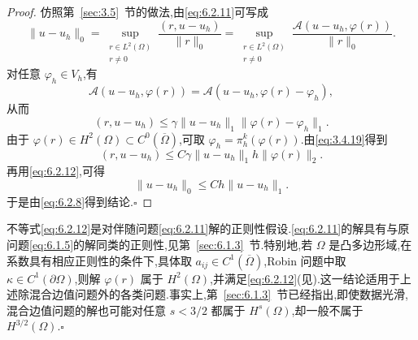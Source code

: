 \begin{proof}
仿照第~\ref{sec:3.5}~节的做法,由\eqref{eq:6.2.11}可写成
\[
  \|u-u_h\|_0
  =\sup_{\substack{r\in L^2(\Omega)\\r\ne0}}\frac{(r,u-u_h)}{\|r\|_0}
  =\sup_{\substack{r\in L^2(\Omega)\\r\ne0}}
       \frac{\mathcal A(u-u_h,\varphi(r))}{\|r\|_0}.
\]
对任意 \(\varphi_h\in V_h\),有
\[
  \mathcal A(u-u_h,\varphi(r))=\mathcal A(u-u_h,\varphi(r)-\varphi_h),
\]
从而
\[
  (r,u-u_h)\le\gamma\|u-u_h\|_1\|\varphi(r)-\varphi_h\|_1.
\]
由于 \(\varphi(r)\in H^2(\Omega)\subset C^0(\overline\Omega)\),可取 \(\varphi_h=\pi_h^k(\varphi(r))\).由\eqref{eq:3.4.19}得到
\[
  (r,u-u_h)\le C\gamma\|u-u_h\|_1h\|\varphi(r)\|_2.
\]
再用\eqref{eq:6.2.12},可得
\[
  \|u-u_h\|_0\le Ch\|u-u_h\|_1.
\]
于是由\eqref{eq:6.2.8}得到结论.\hfill\(\square\)
\end{proof}

\begin{note}
不等式\eqref{eq:6.2.12}是对{\heiti 伴随问题}\eqref{eq:6.2.11}解的正则性假设.\eqref{eq:6.2.11}的解具有与原问题\eqref{eq:6.1.5}的解同类的正则性,见第~\ref{sec:6.1.3}~节.特别地,若 \(\Omega\) 是凸多边形域,在系数具有相应正则性的条件下,具体取 \(a_{ij}\in C^1(\overline\Omega)\),Robin 问题中取 \(\kappa\in C^1(\partial\Omega)\),则解 \(\varphi(r)\) 属于 \(H^2(\Omega)\),并满足\eqref{eq:6.2.12}(见).这一结论适用于上述除混合边值问题外的各类问题.事实上,第~\ref{sec:6.1.3}~节已经指出,即使数据光滑,混合边值问题的解也可能对任意 \(s<3/2\) 都属于 \(H^s(\Omega)\),却一般不属于 \(H^{3/2}(\Omega)\).\hfill\(\square\)
\end{note}

